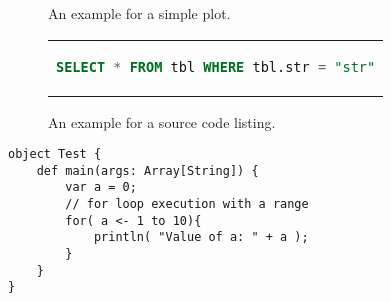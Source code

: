 \begin{figure}[htpb]
  \centering

  \exampleA
  \exampleB
  \caption[Example plot]{An example for a simple plot.}\label{fig:sample-plot}
\end{figure}

\begin{figure}[htpb]
  \centering
  \begin{tabular}{c}
  \begin{lstlisting}[language=SQL]
    SELECT * FROM tbl WHERE tbl.str = "str"
  \end{lstlisting}
  \end{tabular}
  \caption[Example listing]{An example for a source code listing.}\label{fig:sample-listing}
\end{figure}

\begin{minipage}[t]{\textwidth}
\begin{lstlisting}[style=scala, caption=Simple Listing example]
object Test {
    def main(args: Array[String]) {
        var a = 0;
        // for loop execution with a range
        for( a <- 1 to 10){
            println( "Value of a: " + a );
        }
    }
}
\end{lstlisting}
\label{overview}
\end{minipage}

